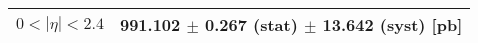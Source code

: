\begin{tabular}{lc}
\hline
\hline
$0 < |\eta| <2.4$              & 991.102 $\pm$ 0.267 (stat) $\pm$ 13.642 (syst) [pb]  \\
\hline
\hline
\end{tabular}
